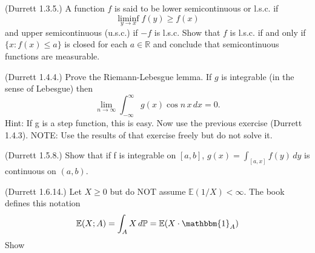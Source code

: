 \documentclass[12pt]{gradescopeexam}
\renewcommand\P{\mathbb{P}}
\newcommand\R{\mathbb{R}}
\newcommand\E{\mathbb{E}}
\newcommand\one{\mathbbm{1}}
\begin{document}
\begin{questions}
  \begin{question}
    (Durrett 1.3.5.) A function $f$ is said to be lower semicontinuous or l.s.c. if
    \[ \liminf_{y\to x} f (y) \ge f (x) \]
    and upper semicontinuous (u.s.c.) if $-f$ is l.s.c. Show that $f$ is l.s.c. if
    and only if $\{x : f (x) \le a\}$ is closed for each $a \in \R$ and conclude that
    semicontinuous functions are measurable.
    \begin{prooforbox}[6.5in]
    \end{prooforbox}
  \end{question}
  
  \begin{question}
    (Durrett 1.4.4.) Prove the Riemann-Lebesgue lemma. If $g$ is
    integrable (in the sense of Lebesgue) then
    \[ \lim_{n\to \infty}   \int_{-\infty}^\infty g(x) \cos n\,x\,dx = 0. \]
    Hint: If g is a step function, this is easy. Now use the previous exercise (Durrett 1.4.3).
    NOTE: Use the results of that exercise freely but do not solve it.
    \begin{prooforbox}[6.5in]
    \end{prooforbox}
  \end{question}

  \begin{question}
    (Durrett 1.5.8.) Show that if f is integrable on $[a, b]$,
    $g(x) = \int_{[a,x]} f(y)\, dy$ is continuous on $(a, b)$.
    \begin{prooforbox}[7.5in]
    \end{prooforbox}
  \end{question}

  \begin{question}
    (Durrett 1.6.14.) Let $X \ge 0$ but do NOT assume $\E(1/X) < \infty$. The book defines
    this notation
    \[ \E(X; A) = \int_{A} X\,d\P = \E(X\cdot \one_A)\]
    Show
    \begin{parts}
      \part
      \[ \lim_{y\to\infty} y\,\E(1/X; X > y) = 0,\]
      \begin{prooforbox}[2.8in]
      \end{prooforbox}
      \part 
      \[\lim_{y\downarrow 0} y\,\E(1/X; X > y) = 0. \]
      \begin{prooforbox}[2.6in]
      \end{prooforbox}
    \end{parts}
  \end{question}
  


\end{questions}
\end{document}
